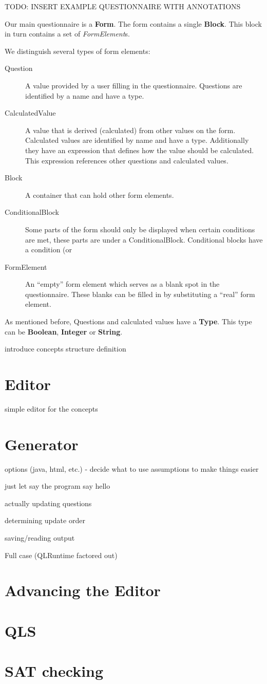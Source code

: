 \documentclass[11pt]{article}
\begin{document}
TODO: INSERT EXAMPLE QUESTIONNAIRE WITH ANNOTATIONS

Our main questionnaire is a \textbf{Form}. The form contains a single \textbf{Block}. This block in turn contains a set of \textit{FormElement}s. 

We distinguish several types of form elements:
\begin{description}
\item[Question] A value provided by a user filling in the questionnaire. Questions are identified by a name and have a type.
\item[CalculatedValue] A value that is derived (calculated) from other values on the form. Calculated values are identified by name and have a type. Additionally they have an expression that defines how the value should be calculated. This expression references other questions and calculated values.
\item[Block] A container that can hold other form elements.
\item[ConditionalBlock] Some parts of the form should only be displayed when certain conditions are met, these parts are under a ConditionalBlock. Conditional blocks have a condition (or 
\item[FormElement] An ``empty'' form element which serves as a blank spot in the questionnaire. These blanks can be filled in by substituting a ``real'' form element.
\end{description}

As mentioned before, Questions and calculated values have a \textbf{Type}. This type can be \textbf{Boolean}, \textbf{Integer} or \textbf{String}.



introduce concepts
structure definition

\section{Editor}
simple editor for the concepts

\section{Generator}
options (java, html, etc.) - decide what to use
assumptions to make things easier

just let say the program say hello

actually updating questions

determining update order

saving/reading output

Full case (QLRuntime factored out)

\section{Advancing the Editor}

\section{QLS}

\section{SAT checking}
\end{document}
